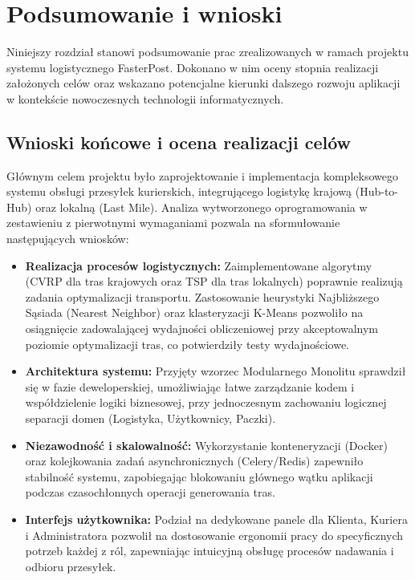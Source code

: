 \chapter{Podsumowanie i wnioski}

Niniejszy rozdział stanowi podsumowanie prac zrealizowanych w ramach projektu systemu logistycznego FasterPost. Dokonano w nim oceny stopnia realizacji założonych celów oraz wskazano potencjalne kierunki dalszego rozwoju aplikacji w kontekście nowoczesnych technologii informatycznych.

\section{Wnioski końcowe i ocena realizacji celów}

Głównym celem projektu było zaprojektowanie i implementacja kompleksowego systemu obsługi przesyłek kurierskich, integrującego logistykę krajową (Hub-to-Hub) oraz lokalną (Last Mile). Analiza wytworzonego oprogramowania w zestawieniu z pierwotnymi wymaganiami pozwala na sformułowanie następujących wniosków:

\begin{itemize}
    \item \textbf{Realizacja procesów logistycznych:} Zaimplementowane algorytmy (CVRP dla tras krajowych oraz TSP dla tras lokalnych) poprawnie realizują zadania optymalizacji transportu. Zastosowanie heurystyki Najbliższego Sąsiada (Nearest Neighbor) oraz klasteryzacji K-Means pozwoliło na osiągnięcie zadowalającej wydajności obliczeniowej przy akceptowalnym poziomie optymalizacji tras, co potwierdziły testy wydajnościowe.
    \item \textbf{Architektura systemu:} Przyjęty wzorzec Modularnego Monolitu sprawdził się w fazie deweloperskiej, umożliwiając łatwe zarządzanie kodem i współdzielenie logiki biznesowej, przy jednoczesnym zachowaniu logicznej separacji domen (Logistyka, Użytkownicy, Paczki).
    \item \textbf{Niezawodność i skalowalność:} Wykorzystanie konteneryzacji (Docker) oraz kolejkowania zadań asynchronicznych (Celery/Redis) zapewniło stabilność systemu, zapobiegając blokowaniu głównego wątku aplikacji podczas czasochłonnych operacji generowania tras.
    \item \textbf{Interfejs użytkownika:} Podział na dedykowane panele dla Klienta, Kuriera i Administratora pozwolił na dostosowanie ergonomii pracy do specyficznych potrzeb każdej z ról, zapewniając intuicyjną obsługę procesów nadawania i odbioru przesyłek.
\end{itemize}

